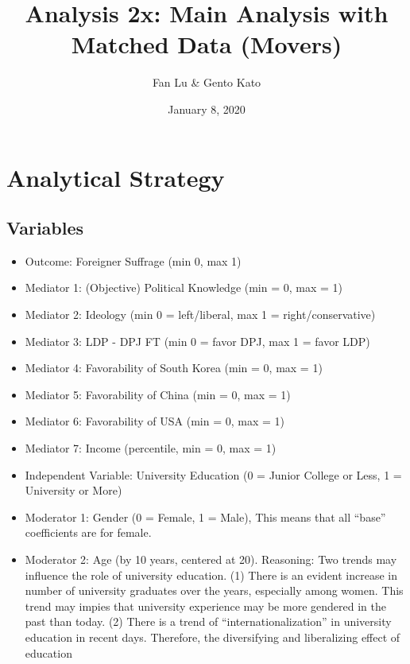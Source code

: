 \documentclass[
]{article}
\title{Analysis 2x: Main Analysis with Matched Data (Movers)}
\author{Fan Lu \& Gento Kato}
\date{January 8, 2020}
\begin{document}
\maketitle

\hypertarget{analytical-strategy}{%
\section{Analytical Strategy}\label{analytical-strategy}}

\hypertarget{variables}{%
\subsection{Variables}\label{variables}}

\begin{itemize}
\item
  Outcome: Foreigner Suffrage (min 0, max 1)
\item
  Mediator 1: (Objective) Political Knowledge (min = 0, max = 1)
\item
  Mediator 2: Ideology (min 0 = left/liberal, max 1 =
  right/conservative)
\item
  Mediator 3: LDP - DPJ FT (min 0 = favor DPJ, max 1 = favor LDP)
\item
  Mediator 4: Favorability of South Korea (min = 0, max = 1)\\
\item
  Mediator 5: Favorability of China (min = 0, max = 1)\\
\item
  Mediator 6: Favorability of USA (min = 0, max = 1)\\
\item
  Mediator 7: Income (percentile, min = 0, max = 1)
\item
  Independent Variable: University Education (0 = Junior College or
  Less, 1 = University or More)
\item
  Moderator 1: Gender (0 = Female, 1 = Male), This means that all
  ``base'' coefficients are for female.
\item
  Moderator 2: Age (by 10 years, centered at 20). Reasoning: Two trends
  may influence the role of university education. (1) There is an
  evident increase in number of university graduates over the years,
  especially among women. This trend may impies that university
  experience may be more gendered in the past than today. (2) There is a
  trend of ``internationalization'' in university education in recent
  days. Therefore, the diversifying and liberalizing effect of education

\end{itemize}
\end{document}
